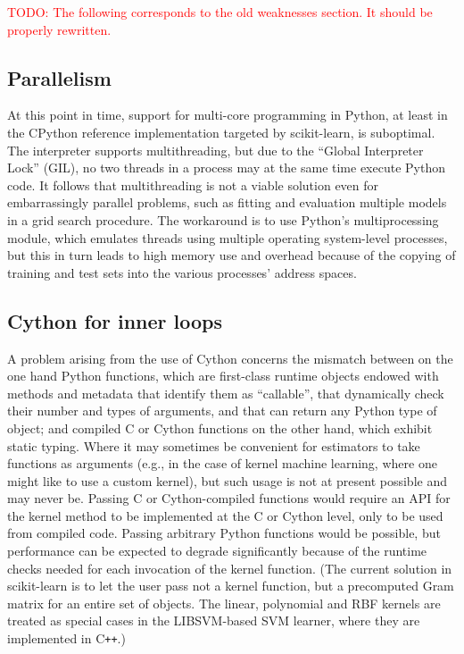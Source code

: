 \documentclass{llncs}
\begin{document}
\textcolor{red}{TODO: The following corresponds to the old weaknesses section. It should be properly rewritten.}

\subsection{Parallelism}
\label{sec:parallel}

At this point in time, support for multi-core programming in Python,
at least in the CPython reference implementation targeted by scikit-learn,
is suboptimal.
The interpreter supports multithreading,
but due to the ``Global Interpreter Lock'' (GIL),
no two threads in a process may at the same time execute Python code.
It follows that multithreading is not a viable solution
even for embarrassingly parallel problems,
such as fitting and evaluation multiple models in a grid search procedure.
The workaround is to use Python's multiprocessing module,
which emulates threads using multiple operating system-level processes,
but this in turn leads to high memory use and overhead
because of the copying of training and test sets
into the various processes' address spaces.

\subsection{Cython for inner loops}

A problem arising from the use of Cython
concerns the mismatch between on the one hand Python functions,
which are first-class runtime objects endowed with methods and metadata
that identify them as ``callable'',
that dynamically check their number and types of arguments,
and that can return any Python type of object;
and compiled C or Cython functions on the other hand,
which exhibit static typing.
Where it may sometimes be convenient for estimators
to take functions as arguments
(e.g., in the case of kernel machine learning,
where one might like to use a custom kernel),
but such usage is not at present possible and may never be.
Passing C or Cython-compiled functions
would require an API for the kernel method
to be implemented at the C or Cython level,
only to be used from compiled code.
Passing arbitrary Python functions would be possible,
but performance can be expected to degrade significantly
because of the runtime checks needed for each invocation of the kernel function.
(The current solution in scikit-learn is to let the user pass
not a kernel function,
but a precomputed Gram matrix for an entire set of objects.
The linear, polynomial and RBF kernels are treated as special cases in
the \textsf{LIBSVM}-based SVM learner,
where they are implemented in C{}\verb!++!.)
\end{document}
